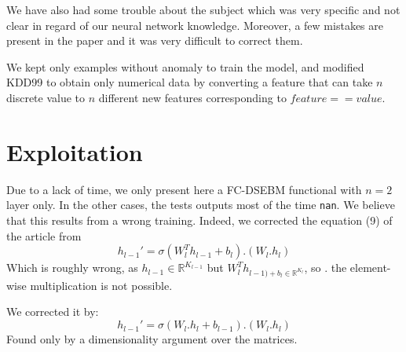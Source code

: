\documentclass[a4paper]{article}
\begin{document}
We have also had some trouble about the subject which was very specific and not clear in regard of our neural network knowledge. Moreover, a few mistakes are present in the paper and it was very difficult to correct them.

We kept only examples without anomaly to train the model, and modified KDD99 to obtain only numerical data by converting a feature that can take $n$ discrete value to $n$ different new features corresponding to $feature == value$.


\section{Exploitation}
Due to a lack of time, we only present here a FC-DSEBM functional with $n=2$ layer only. In the other cases, the tests outputs most of the time \texttt{nan}. We believe that this results from a wrong training. Indeed, we corrected the equation  (9) of the article from 
\[h_{l-1}' = \sigma (W_l^T h_{l-1} + b_l) . ( W_l.h_l)\]
Which is roughly wrong, as $h_{l-1} \in \mathbb{R}^{K_{l-1}}$ but $W_l^T h_{l-1) + b_l \in \mathbb{R}^{K_{l}}}$, so $.$ the element-wise multiplication is not possible.

We corrected it by:
\[h_{l-1}' = \sigma (W_{l}. h_{l} + b_{l-1}) . ( W_l.h_l)\]
Found only by a dimensionality argument over the matrices.

\bigskip





\newpage



\end{document}
